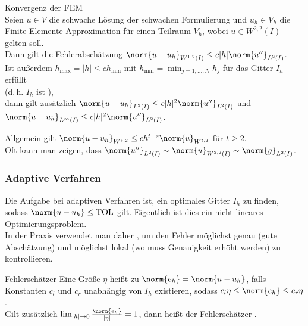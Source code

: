 \begin{Satz}{Konvergenz der FEM}\\
    Seien $u \in V$ die schwache Lösung der schwachen Formulierung und
    $u_h \in V_h$ die Finite-Elemente-Appro\-ximation für einen Teilraum $V_h$,
    wobei $u \in W^{2,2}(I)$ gelten soll.\\
    Dann gilt die Fehlerabschätzung
    $\norm{u - u_h}_{W^{1,2}(I)} \le c |h| \norm{u''}_{L^2(I)}$.\\
    Ist außerdem $h_{\max} = |h| \le c h_{\min}$ mit
    $h_{\min} = \min_{j=1,\dotsc,N} h_j$ für das Gitter $I_h$ erfüllt\\
    (d.\,h. $I_h$ ist ),\\
    dann gilt zusätzlich
    $\norm{u - u_h}_{L^2(I)} \le c |h|^2 \norm{u''}_{L^2(I)}$
    und $\norm{u - u_h}_{L^\infty(I)} \le c |h|^2 \norm{u''}_{L^2(I)}$.
\end{Satz}

\begin{Bem}
    Allgemein gilt $\norm{u - u_h}_{W^{s,2}} \le c h^{t-s} \norm{u}_{W^{t,2}}$
    für $t \ge 2$.\\
    Oft kann man zeigen, dass
    $\norm{u''}_{L^2(I)} \sim \norm{u}_{W^{2,2}(I)} \sim \norm{g}_{L^2(I)}$.
\end{Bem}

\subsubsection{%
    Adaptive Verfahren%
}

\begin{Bem}
    Die Aufgabe bei adaptiven Verfahren ist, ein optimales Gitter $I_h$ zu
    finden, sodass $\norm{u - u_h} \le \TOL$ gilt.
    Eigentlich ist dies ein nicht-lineares Optimierungsproblem.\\
    In der Praxis verwendet man daher ,
    um den Fehler möglichst genau (gute Abschätzung) und
    möglichst lokal (wo muss Genauigkeit erhöht werden) zu kontrollieren.
\end{Bem}

\begin{Def}{Fehlerschätzer}
    Eine Größe $\eta$ heißt  zu
    $\norm{e_h} = \norm{u - u_h}$, falls Konstanten $c_l$ und $c_r$
    unabhängig von $I_h$ existieren, sodass
    $c_l \eta \le \norm{e_h} \le c_r \eta$.\\
    Gilt zusätzlich $\lim_{|h| \to 0} \frac{\norm{e_h}}{|\eta|} = 1$,
    dann heißt der Fehlerschätzer .
\end{Def}

